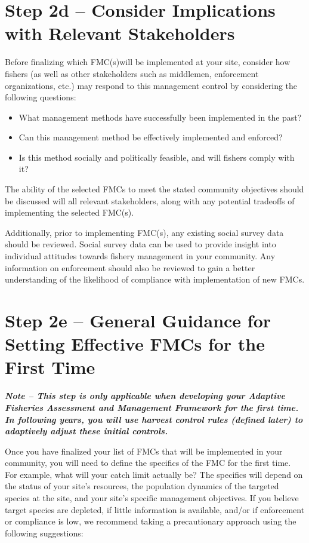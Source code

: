 \documentclass[]{book}
\begin{document}
\hypertarget{Step2d}{\section{Step 2d -- Consider Implications with
Relevant Stakeholders}\label{Step2d}}

Before finalizing which FMC(s)will be implemented at your site, consider
how fishers (as well as other stakeholders such as middlemen,
enforcement organizations, etc.) may respond to this management control
by considering the following questions:

\begin{itemize}
\item
  What management methods have successfully been implemented in the
  past?
\item
  Can this management method be effectively implemented and enforced?
\item
  Is this method socially and politically feasible, and will fishers
  comply with it?
\end{itemize}

The ability of the selected FMCs to meet the stated community objectives
should be discussed will all relevant stakeholders, along with any
potential tradeoffs of implementing the selected FMC(s).

Additionally, prior to implementing FMC(s), any existing social survey
data should be reviewed. Social survey data can be used to provide
insight into individual attitudes towards fishery management in your
community. Any information on enforcement should also be reviewed to
gain a better understanding of the likelihood of compliance with
implementation of new FMCs.

\section{Step 2e -- General Guidance for Setting Effective FMCs for the
First Time}\label{Step2e}

\textbf{\emph{Note -- This step is only applicable when developing your
Adaptive Fisheries Assessment and Management Framework for the first
time. In following years, you will use harvest control rules (defined
later) to adaptively adjust these initial controls.}}

Once you have finalized your list of FMCs that will be implemented in
your community, you will need to define the specifics of the FMC for the
first time. For example, what will your catch limit actually be? The
specifics will depend on the status of your site's resources, the
population dynamics of the targeted species at the site, and your site's
specific management objectives. If you believe target species are
depleted, if little information is available, and/or if enforcement or
compliance is low, we recommend taking a precautionary approach using
the following suggestions:
\end{document}
